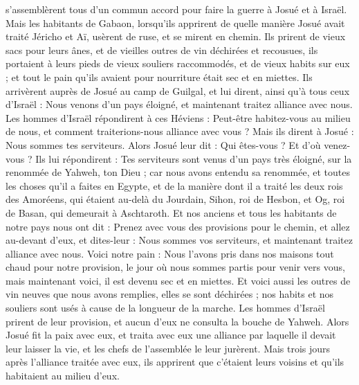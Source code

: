 \begin{multicols}{2}
s’assemblèrent tous d’un commun accord pour faire la guerre à Josué et à Israël.
Mais les habitants de Gabaon, lorsqu’ils apprirent de quelle manière Josué avait traité Jéricho et Aï,
usèrent de ruse, et se mirent en chemin. Ils prirent de vieux sacs pour leurs ânes, et de vieilles outres de vin déchirées et recousues,
ils portaient à leurs pieds de vieux souliers raccommodés, et de vieux habits sur eux ; et tout le pain qu’ils avaient pour nourriture était sec et en miettes.
Ils arrivèrent auprès de Josué au camp de Guilgal, et lui dirent, ainsi qu’à tous ceux d’Israël : Nous venons d’un pays éloigné, et maintenant traitez alliance avec nous.
Les hommes d’Israël répondirent à ces Héviens : Peut-être habitez-vous au milieu de nous, et comment traiterions-nous alliance avec vous ?
Mais ils dirent à Josué : Nous sommes tes serviteurs. Alors Josué leur dit : Qui êtes-vous ? Et d’où venez-vous ?
Ils lui répondirent : Tes serviteurs sont venus d’un pays très éloigné, sur la renommée de Yahweh, ton Dieu ; car nous avons entendu sa renommée, et toutes les choses qu’il a faites en Egypte,
et de la manière dont il a traité les deux rois des Amoréens, qui étaient au-delà du Jourdain, Sihon, roi de Hesbon, et Og, roi de Basan, qui demeurait à Aschtaroth.
Et nos anciens et tous les habitants de notre pays nous ont dit : Prenez avec vous des provisions pour le chemin, et allez au-devant d’eux, et dites-leur : Nous sommes vos serviteurs, et maintenant traitez alliance avec nous.
Voici notre pain : Nous l’avons pris dans nos maisons tout chaud pour notre provision, le jour où nous sommes partis pour venir vers vous, mais maintenant voici, il est devenu sec et en miettes.
Et voici aussi les outres de vin neuves que nous avons remplies, elles se sont déchirées ; nos habits et nos souliers sont usés à cause de la longueur de la marche.
Les hommes d’Israël prirent de leur provision, et aucun d’eux ne consulta la bouche de Yahweh\FTNT{}.
Alors Josué fit la paix avec eux, et traita avec eux une alliance par laquelle il devait leur laisser la vie, et les chefs de l’assemblée le leur jurèrent.
Mais trois jours après l’alliance traitée avec eux, ils apprirent que c’étaient leurs voisins et qu’ils habitaient au milieu d’eux.

\end{multicols}
